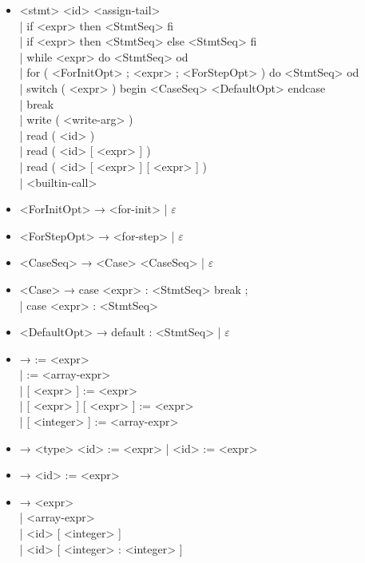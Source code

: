 \documentclass[a4paper,final]{article}
\begin{document}
\begin{itemize}
\begin{itemize}
                \\| <id> [ <integer> ] [ <integer> ] = <array-expr>
                \\| <id> [ <integer> ] [ <integer> ]
\item <stmt>      <id> <assign-tail>
                \\| if <expr> then <StmtSeq> fi
                \\| if <expr> then <StmtSeq> else <StmtSeq> fi
                \\| while <expr> do <StmtSeq> od
                \\| for ( <ForInitOpt> ; <expr> ; <ForStepOpt> ) do <StmtSeq> od
                \\| switch ( <expr> ) begin <CaseSeq> <DefaultOpt> endcase
                \\| break
                \\| write ( <write-arg> )
                \\| read ( <id> )
                \\| read ( <id> [ <expr> ] )
                \\| read ( <id> [ <expr> ] [ <expr> ] )
                \\| <builtin-call>
\item <ForInitOpt>   → <for-init> | \ensuremath{\varepsilon}
\item <ForStepOpt>   → <for-step> | \ensuremath{\varepsilon}
\item <CaseSeq>      → <Case> <CaseSeq> | \ensuremath{\varepsilon}
\item <Case>         → case <expr> : <StmtSeq> break ; \\| case <expr> : <StmtSeq>
\item <DefaultOpt>   → default : <StmtSeq> | \ensuremath{\varepsilon}
\item <assign-tail>  → := <expr>
                \\| := <array-expr>
                \\| [ <expr> ] := <expr>
                \\| [ <expr> ] [ <expr> ] := <expr>
                \\| [ <integer> ] := <array-expr>
\item <for-init>     → <type> <id> := <expr> | <id> := <expr>
\item <for-step>     → <id> := <expr>
\item <write-arg>    → <expr> \\| <array-expr> \\| <id> [ <integer> ] \\| <id> [ <integer> : <integer> ]

\end{itemize}
\end{itemize}
\end{document}
